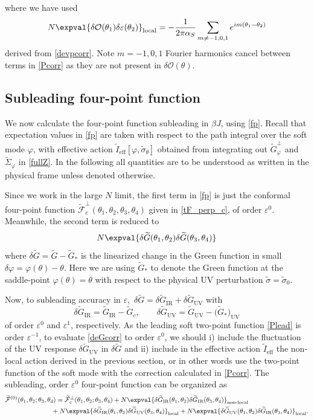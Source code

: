 \documentclass[12pt]{article}
\newcommand{\calF}{\mathcal{F}}
\newcommand{\eff}{\text{eff}}
\newcommand{\loc}{\text{local}}
\newcommand{\nloc}{\text{non-local}}
\newcommand{\IR}{\text{IR}}
\newcommand{\UV}{\text{UV}}
\newcommand{\tI}{\tilde{I}}
\newcommand{\tG}{\widetilde{G}}
\newcommand{\tF}{\widetilde{\calF}}
\newcommand{\tSig}{\widetilde{\Sigma}}
\newcommand{\tsig}{\tilde{\sigma}}
\newcommand{\OO}{\mathcal{O}}
\newcommand{\al}{\alpha}
\newcommand{\tht}{\theta}
\newcommand{\de}{\delta}
\newcommand{\vep}{\varepsilon}
\newcommand{\vp}{\varphi}
\newcommand{\be}{\begin{equation}}
\newcommand{\ee}{\end{equation}}
\newcommand{\ov}{\over}
\begin{document}
where we have used
\be \label{altlead}
N\expval{\de \OO(\tht_1)\de \vep(\tht_2)}_{\loc}=-{1 \ov 2 \pi \al_S}\sum_{m \neq -1,0,1}e^{im(\tht_1-\tht_2)}
\ee
derived from \eqref{devpcorr}. Note $m=-1,0,1$ Fourier harmonics cancel between terms in \eqref{Pcorr} as they are not present in $\de\OO(\tht)$.




\subsection{Subleading four-point function}\label{sec_sub4}

We now calculate the four-point function subleading in $\beta J$, using \eqref{fp}. Recall that expectation values in \eqref{fp} are taken with respect to the path integral over the soft mode $\vp$, with effective action $\tI_{\eff}[\vp, \tsig_{\tht}]$ obtained from integrating out $\tG^{\perp}_{\vp}$ and $\tSig_{\vp}$ in \eqref{fullZ}. In the following all quantities are to be understood as written in the physical frame unless denoted otherwise. 

Since we work in the large $N$ limit, the first term in \eqref{fp} is just the conformal four-point function $\tF^{\perp}_c(\tht_1, \tht_2, \tht_3, \tht_4)$ given in \eqref{tF_perp_c}, of order $\vep^0$. Meanwhile, the second term is reduced to
\be \label{deGcorr}
N \expval{\de \tG(\tht_1, \tht_2)\de \tG(\tht_3, \tht_4)}
\ee
where $\de \tG=\tG- \tG_*$ is the linearized change in the Green function in small $\de \vp=\vp(\tht)-\tht$. Here we are using $\tG_*$ to denote the Green function at the saddle-point $\vp(\tht)=\tht$ with respect to the physical UV perturbation $\tsig=\tsig_{0}$.

Now, to subleading accuracy in $\vep$,\, $\de \tG=\de \tG_{\IR}+\de \tG_{\UV}$ with
\be
\de \tG_{\IR}=\tG_{\IR}-\tG_c, \qquad \de\tG_{\UV}=\tG_{\UV}-\big(\tG_{*}\big)_{\UV}
\ee
of order $\vep^0$ and $\vep^1$, respectively. As the leading soft two-point function \eqref{Plead} is order $\vep^{-1}$, to evaluate \eqref{deGcorr} to order $\vep^0$, we should i) include the fluctuation of the UV response $\de \tG_{\UV}$ in $\de \tG$ and ii) include in the effective action $\tI_{\eff}$ the non-local action derived in the previous section, or in other words use the two-point function of the soft mode with the correction calculated in \eqref{Pcorr}. The subleading, order $\vep^0$ four-point function can be organized as
\begin{equation}\label{subleadF}
\begin{aligned}
\tF^{(0)}(\tht_1, \tht_2; \tht_3, \tht_4)
={}&\tF_c^{\perp}(\tht_1, \tht_2; \tht_3, \tht_4)+N\expval{\de \tG_{\IR}(\tht_1, \tht_2) \de\tG_{\IR}(\tht_3, \tht_4)}_{\nloc}
\\
&\hspace{-20pt}+N\expval{\de \tG_{\IR}(\tht_1, \tht_2)\de\tG_{\UV}(\tht_3, \tht_4)}_{\loc}+N\expval{\de \tG_{\UV}(\tht_1, \tht_2)\de\tG_{\IR}(\tht_3, \tht_4)}_{\loc}.
\end{aligned}
\end{equation}
\end{document}
